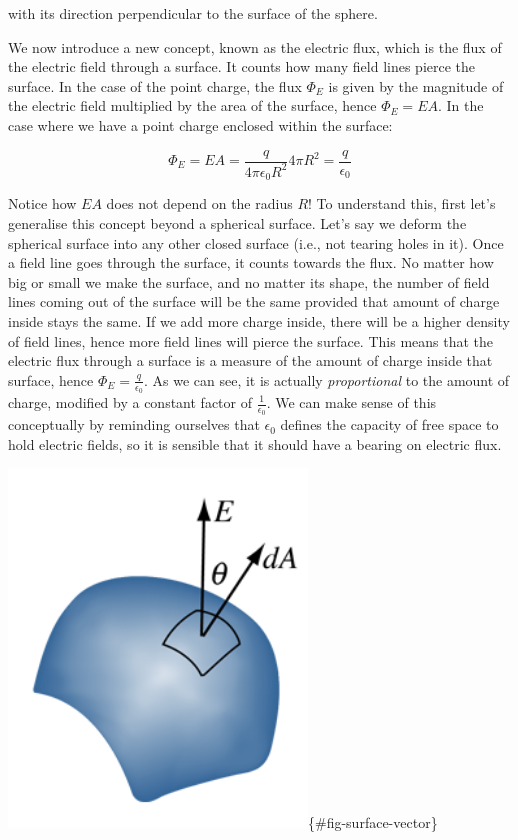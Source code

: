 \documentclass[
  letterpaper,
  DIV=11,
  numbers=noendperiod]{scrreprt}
\begin{document}
with its direction perpendicular to the surface of the sphere.

We now introduce a new concept, known as the electric flux, which is the
flux of the electric field through a surface. It counts how many field
lines pierce the surface. In the case of the point charge, the flux
\(\Phi_E\) is given by the magnitude of the electric field multiplied by
the area of the surface, hence \(\Phi_E = EA\). In the case where we
have a point charge enclosed within the surface:

\[ \Phi_E = EA = \frac{q}{4\pi\epsilon_0 R^2} 4\pi R^2 = \frac{q}{\epsilon_0} \]

Notice how \(EA\) does not depend on the radius \(R\)! To understand
this, first let's generalise this concept beyond a spherical surface.
Let's say we deform the spherical surface into any other closed surface
(i.e., not tearing holes in it). Once a field line goes through the
surface, it counts towards the flux. No matter how big or small we make
the surface, and no matter its shape, the number of field lines coming
out of the surface will be the same provided that amount of charge
inside stays the same. If we add more charge inside, there will be a
higher density of field lines, hence more field lines will pierce the
surface. This means that the electric flux through a surface is a
measure of the amount of charge inside that surface, hence
\(\Phi_E = \frac{q}{\epsilon_0}\). As we can see, it is actually
\emph{proportional} to the amount of charge, modified by a constant
factor of \(\frac{1}{\epsilon_0}\). We can make sense of this
conceptually by reminding ourselves that \(\epsilon_0\) defines the
capacity of free space to hold electric fields, so it is sensible that
it should have a bearing on electric flux.

\includegraphics[width=3.125in,height=\textheight]{Figures/Gauss-surface-vector.png}\{\#fig-surface-vector\}
\end{document}

